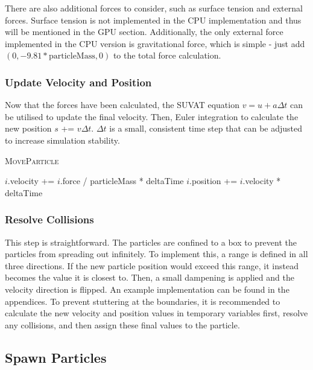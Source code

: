 \documentclass[12pt]{article}
\begin{document}
    There are also additional forces to consider, such as surface tension and external forces. Surface tension is not implemented in the CPU implementation and thus will be mentioned in the GPU section. Additionally, the only external force implemented in the CPU version is gravitational force, which is simple - just add $(0, -9.81 * \text{particleMass}, 0)$ to the total force calculation.

    \subsubsection{Update Velocity and Position}
    Now that the forces have been calculated, the SUVAT equation $v = u + a\Delta{t}$ can be utilised to update the final velocity. Then, Euler integration to calculate the new position $s$ += $v\Delta{t}$. $\Delta{t}$ is a small, consistent time step that can be adjusted to increase simulation stability.

    \begin{algorithm}[H]
        \caption{\textsc{MoveParticle}}
    
        \begin{algorithmic}
                \State $i$.velocity += $i$.force / particleMass * deltaTime
                \State $i$.position += $i$.velocity * deltaTime
            \EndFor
        \end{algorithmic}

    \end{algorithm}

    \subsubsection{Resolve Collisions}

    This step is straightforward. The particles are confined to a box to prevent the particles from spreading out infinitely. To implement this, a range is defined in all three directions. If the new particle position would exceed this range, it instead becomes the value it is closest to. Then, a small dampening is applied and the velocity direction is flipped. An example implementation can be found in the appendices. To prevent stuttering at the boundaries, it is recommended to calculate the new velocity and position values in temporary variables first, resolve any collisions, and then assign these final values to the particle.

    \subsection{Spawn Particles}
\end{document}
